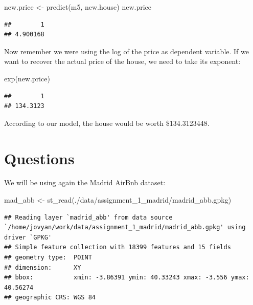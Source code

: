 \documentclass[
]{book}
\newenvironment{Shaded}{\begin{snugshade}}{\end{snugshade}}
\newcommand{\FunctionTok}[1]{\textcolor[rgb]{0.00,0.00,0.00}{#1}}
\newcommand{\NormalTok}[1]{#1}
\newcommand{\OtherTok}[1]{\textcolor[rgb]{0.56,0.35,0.01}{#1}}
\newcommand{\StringTok}[1]{\textcolor[rgb]{0.31,0.60,0.02}{#1}}
\begin{document}
\begin{Shaded}
\begin{Highlighting}[]
\NormalTok{new.price }\OtherTok{\textless{}{-}} \FunctionTok{predict}\NormalTok{(m5, new.house)}
\NormalTok{new.price}
\end{Highlighting}
\end{Shaded}

\begin{verbatim}
##        1 
## 4.900168
\end{verbatim}

Now remember we were using the log of the price as dependent variable. If we want to recover the actual price of the house, we need to take its exponent:

\begin{Shaded}
\begin{Highlighting}[]
\FunctionTok{exp}\NormalTok{(new.price)}
\end{Highlighting}
\end{Shaded}

\begin{verbatim}
##        1 
## 134.3123
\end{verbatim}

According to our model, the house would be worth \$134.3123448.

\hypertarget{questions-2}{%
\section{Questions}\label{questions-2}}

We will be using again the Madrid AirBnb dataset:

\begin{Shaded}
\begin{Highlighting}[]
\NormalTok{mad\_abb }\OtherTok{\textless{}{-}} \FunctionTok{st\_read}\NormalTok{(}\StringTok{\textquotesingle{}./data/assignment\_1\_madrid/madrid\_abb.gpkg\textquotesingle{}}\NormalTok{)}
\end{Highlighting}
\end{Shaded}

\begin{verbatim}
## Reading layer `madrid_abb' from data source `/home/jovyan/work/data/assignment_1_madrid/madrid_abb.gpkg' using driver `GPKG'
## Simple feature collection with 18399 features and 15 fields
## geometry type:  POINT
## dimension:      XY
## bbox:           xmin: -3.86391 ymin: 40.33243 xmax: -3.556 ymax: 40.56274
## geographic CRS: WGS 84
\end{verbatim}
\end{document}
